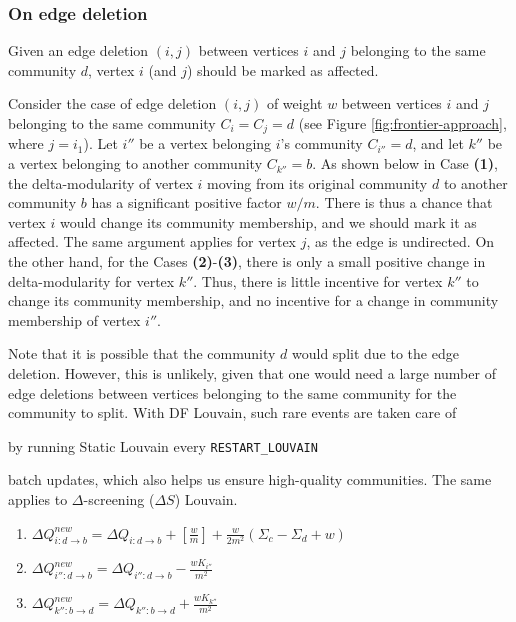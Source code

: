 




\subsubsection{On edge deletion}

\begin{lemma}
\label{thm:louvain--mark-deletion}
Given an edge deletion $(i, j)$ between vertices $i$ and $j$ belonging to the same community $d$, vertex $i$ (and $j$) should be marked as affected.
\end{lemma}

Consider the case of edge deletion $(i, j)$ of weight $w$ between vertices $i$ and $j$ belonging to the same community $C_i = C_j = d$ (see Figure \ref{fig:frontier-approach}, where $j = i_1$). Let $i''$ be a vertex belonging $i$'s community $C_{i''} = d$, and let $k''$ be a vertex belonging to another community $C_{k''} = b$. As shown below in Case \textbf{(1)}, the delta-modularity of vertex $i$ moving from its original community $d$ to another community $b$ has a significant positive factor $w/m$. There is thus a chance that vertex $i$ would change its community membership, and we should mark it as affected. The same argument applies for vertex $j$, as the edge is undirected. On the other hand, for the Cases \textbf{(2)}-\textbf{(3)}, there is only a small positive change in delta-modularity for vertex $k''$. Thus, there is little incentive for vertex $k''$ to change its community membership, and no incentive for a change in community membership of vertex $i''$.

Note that it is possible that the community $d$ would split due to the edge deletion. However, this is unlikely, given that one would need a large number of edge deletions between vertices belonging to the same community for the community to split. With DF Louvain, such rare events are taken care of by running Static Louvain every \verb|RESTART_LOUVAIN| batch updates, which also helps us ensure high-quality communities. The same applies to $\Delta$-screening ($\Delta S$) Louvain.

\begin{enumerate}
  \item $\Delta Q_{i:d \rightarrow b}^{new} = \Delta Q_{i:d \rightarrow b} + [\frac{w}{m}] + \frac{w}{2m^2} (\Sigma_c - \Sigma_d + w)$
  \item $\Delta Q_{i'':d \rightarrow b}^{new} = \Delta Q_{i'':d \rightarrow b} - \frac{wK_{i''}}{m^2}$
  \item $\Delta Q_{k'':b \rightarrow d}^{new} = \Delta Q_{k'':b \rightarrow d} + \frac{wK_{k''}}{m^2}$
\end{enumerate}

